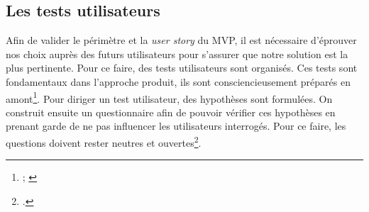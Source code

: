 \subsection{Les tests utilisateurs}

Afin de valider le périmètre et la \textit{user story} du \gls{MVP}, il est nécessaire d’éprouver nos choix auprès des futurs utilisateurs pour s'assurer que notre solution est la plus pertinente. Pour ce faire, des tests utilisateurs sont organisés. Ces tests sont fondamentaux dans l’approche produit, ils sont consciencieusement préparés en amont\footnote{\cite{tanovic_customer_2024} ; \cite{ux-republic_guideline_2019}}. Pour diriger un test utilisateur, des hypothèses sont formulées. On construit ensuite un questionnaire afin de pouvoir vérifier ces hypothèses en prenant garde de ne pas influencer les utilisateurs interrogés. Pour ce faire, les questions doivent rester neutres et ouvertes\footcite{buset_leading_2024}. 



